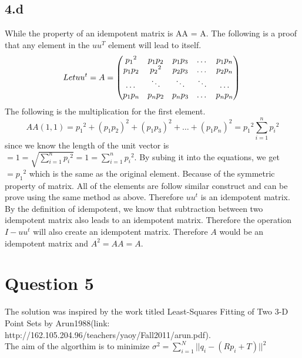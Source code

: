 \documentclass{article}
\begin{document}
\subsection*{4.d}
While the property of an idempotent matrix is AA = A. The following is a proof that any element in the $uu^T$ element will lead to itself.
\begin{equation}
Let\space uu^t = A =
\begin{pmatrix}
   {p_1}^2  &  p_1p_2  &  p_1p_3 & \dots & p_1p_n\\
    p_1p_2  &  {p_2}^2  &  p_2p_3 & \dots & p_2p_n\\
    \dots & \ddots & \ddots & \ddots & \dots \\
    p_1p_n &  p_np_2  &  p_np_3 & \dots & p_np_n\\
\end{pmatrix} \\
\end{equation}
The following is the multiplication for the first element.
\begin{equation}
AA(1,1) = {p_1}^2 + (p_1p_2)^2 + (p_1p_3)^2 + \dots + (p_1p_n)^2 = {p_1}^2 \sum_{i = 1}^{n}{{p_i}^2}
\end{equation}
since we know the length of the unit vector is $ = 1 = \sqrt{\sum_{i = 1}^{n}{{p_i}^2}} = 1 = \sum_{i = 1}^{n}{{p_i}^2}$. By subing it into the equations, we get
$ = {p_1}^2$ which is the same as the original element. Because of the symmetric property of matrix. All of the elements are follow similar construct and can be prove using the same method as above. Therefore $uu^t$ is an idempotent matrix. By the definition of idempotent, we know that subtraction between two idempotent matrix also leads to an idempotent matrix. Therefore the operation $I - uu^t$ will also create an idempotent matrix. Therefore $A$ would be an idempotent matrix and $A^2 = AA = A$.

\section{Question 5}
The solution was inspired by the work titled Least-Squares Fitting of Two 3-D Point Sets by Arun1988(link: http://162.105.204.96/teachers/yaoy/Fall2011/arun.pdf).\\
The aim of the algorthim is to minimize $\sigma^2 = \sum_{i = 1}^{N}||q_i - (Rp_i + T)||^2$\\

\end{document}

